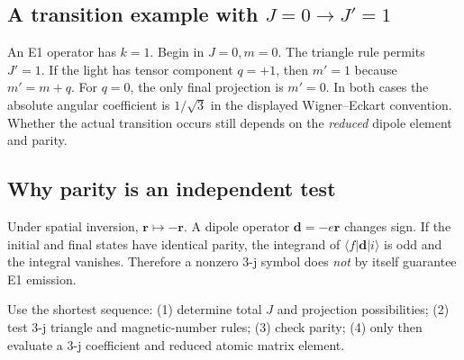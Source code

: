 \subsection{A transition example with \(J=0\to J'=1\)}
An E1 operator has \(k=1\). Begin
in \(J=0,m=0\). The triangle rule permits
\(J'=1\). If the light has tensor
component \(q=+1\), then \(m'=1\)
because \(m'=m+q\).
For \(q=0\), the only final projection is
\(m'=0\). In both cases the absolute
angular coefficient is \(1/\sqrt3\)
in the displayed Wigner--Eckart convention.
Whether the actual transition occurs
still depends on the \emph{reduced}
dipole element and parity.

\subsection{Why parity is an independent test}
Under spatial inversion,
\(\mathbf r\mapsto-\mathbf r\).
A dipole operator \(\mathbf d=-e\mathbf r\)
changes sign. If the initial and final
states have identical parity, the
integrand of \(\langle f|\mathbf d|i\rangle\)
is odd and the integral vanishes.
Therefore a nonzero 3-j symbol does
\emph{not} by itself guarantee E1 emission.

\begin{checkpoint}
Use the shortest sequence:
(1) determine total \(J\) and projection
possibilities; (2) test 3-j triangle and
magnetic-number rules; (3) check parity;
(4) only then evaluate a 3-j coefficient
and reduced atomic matrix element.
\end{checkpoint}
